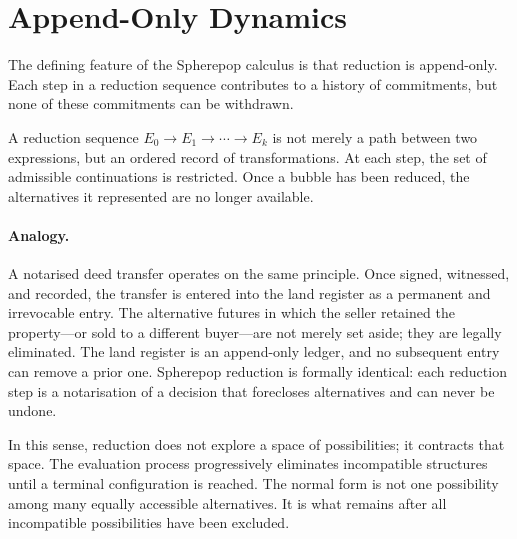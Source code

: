 \documentclass[12pt, oneside]{amsbook}
\theoremstyle{plain}
\theoremstyle{definition}
\theoremstyle{remark}
\begin{document}
\section{Append-Only Dynamics}
\label{sec:sp:appendonly}

The defining feature of the Spherepop calculus is that reduction is
append-only. Each step in a reduction sequence contributes to a history of
commitments, but none of these commitments can be withdrawn.

A reduction sequence $E_0 \to E_1 \to \cdots \to E_k$ is not merely a path
between two expressions, but an ordered record of transformations. At each
step, the set of admissible continuations is restricted. Once a bubble has been
reduced, the alternatives it represented are no longer available.

\paragraph{Analogy.}
A notarised deed transfer operates on the same principle. Once signed, witnessed, and recorded, the transfer is entered into the land register as a permanent and irrevocable entry. The alternative futures in which the seller retained the property---or sold to a different buyer---are not merely set aside; they are legally eliminated. The land register is an append-only ledger, and no subsequent entry can remove a prior one. Spherepop reduction is formally identical: each reduction step is a notarisation of a decision that forecloses alternatives and can never be undone.

In this sense, reduction does not explore a space of possibilities; it contracts
that space. The evaluation process progressively eliminates incompatible
structures until a terminal configuration is reached. The normal form is not
one possibility among many equally accessible alternatives. It is what remains
after all incompatible possibilities have been excluded.
\end{document}
